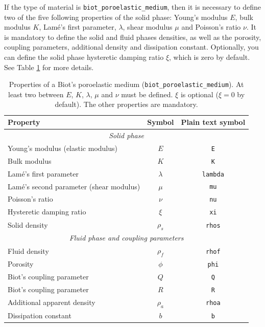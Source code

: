\documentclass[a4paper,fleqn]{book}
\begin{document}
If the type of material is \texttt{biot\_poroelastic\_medium}, then it is necessary to define two of the five following properties of the solid phase: Young's modulus $E$, bulk modulus $K$, Lam\'e's first parameter, $\lambda$, shear modulus $\mu$ and Poisson's ratio $\nu$. It is mandatory to define the solid and fluid phases densities, as well as the porosity, coupling parameters, additional density and dissipation constant. Optionally, you can define the solid phase hysteretic damping ratio $\xi$, which is zero by default. See Table \ref{tab:poroelastic} for more details.

\begin{table}[h]
\centering
{\small
\begin{tabular}{lcc}
\textbf{Property} & \textbf{Symbol} & \textbf{Plain text symbol} \\
\midrule
\multicolumn{3}{c}{\textit{Solid phase}} \\
\midrule
Young's modulus (elastic modulus)         & $E$       & \texttt{E}      \\
Bulk modulus                              & $K$       & \texttt{K}      \\
Lam\'e's first parameter                  & $\lambda$ & \texttt{lambda} \\
Lam\'e's second parameter (shear modulus) & $\mu$     & \texttt{mu}     \\
Poisson's ratio                           & $\nu$     & \texttt{nu}     \\
Hysteretic damping ratio                  & $\xi$     & \texttt{xi}     \\
Solid density                             & $\rho_s$  & \texttt{rhos}   \\
\midrule
\multicolumn{3}{c}{\textit{Fluid phase and coupling parameters}} \\
\midrule
Fluid density               & $\rho_f$ & \texttt{rhof} \\
Porosity                    & $\phi$   & \texttt{phi}  \\
Biot's coupling parameter   & $Q$      & \texttt{Q}    \\
Biot's coupling parameter   & $R$      & \texttt{R}    \\
Additional apparent density & $\rho_a$ & \texttt{rhoa} \\
Dissipation constant        & $b$      & \texttt{b}    \\
\end{tabular}
}
\caption{Properties of a Biot's poroelastic medium (\texttt{biot\_poroelastic\_medium}). At least two between $E$, $K$, $\lambda$, $\mu$ and $\nu$ must be defined. $\xi$ is optional ($\xi=0$ by default). The other properties are mandatory.}
\label{tab:poroelastic}
\end{table}
\end{document}
